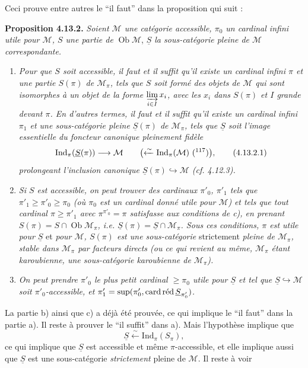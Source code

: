 \documentclass[11pt]{article}
\newcommand{\printedpage}[1]{\marginpar{\footnotesize p.~#1}}
\newcommand{\msp}[1]{\marginpar{\footnotesize [#1]}}
\newcommand{\Ind}{\mathrm{Ind}}
\newcommand{\Ob}{\operatorname{Ob}}
\newcommand{\card}{\operatorname{card}}
\newcommand{\M}{\mathcal{M}}
\newcommand{\red}{\mathop{\textup{réd}}\nolimits}
\newcommand{\uS}{\underline{S}}
\begin{document}
Ceci prouve entre autres le “il faut” dans la proposition qui suit :

\textbf{Proposition 4.13.2.} \textit{Soient $\M$ une catégorie accessible, $\pi_0$ un cardinal infini utile pour $\M$, $S$ une partie de} $\Ob\M$, \textit{$\uS$ la sous-catégorie pleine de $\M$ correspondante.}

\msp{page 284}
\begin{enumerate}
\item[\textit{a)}] \textit{Pour que $S$ soit accessible, il faut et il suffit qu'il existe un cardinal infini $\pi$ et une partie $S(\pi)$ de $\M_\pi$, tels que $S$ soit formé des objets de $\M$ qui sont isomorphes à un objet de la forme $\varinjlim\limits_{i\in I} x_i$, avec les $x_i$ dans $S(\pi)$ et $I$ grande devant $\pi$. En d'autres termes, il faut et il suffit qu'il existe un cardinal infini $\pi_1$ et une sous-catégorie pleine %
$\uS(\pi)$ de $\M_\pi$, tels que $\uS$ soit l'image essentielle du foncteur canonique pleinement fidèle}
\[
\Ind_\pi(\uS(\pi)) \longrightarrow \M \qquad \bigl(\xleftarrow{\sim} \Ind_\pi(\M)\ \text{(\footnotemark[117])}\bigr) , \tag*{(4.13.2.1)} %
\]
\footnotetext[117]{si $\pi$ utile pour $\M$.}
\textit{prolongeant l'inclusion canonique $\uS(\pi) \hookrightarrow \M$ (cf. 4.12.3).}
\item[\textit{b)}] \printedpage{106}
\textit{Si $S$ est accessible, on peut trouver des cardinaux $\pi'_0$, $\pi'_1$ tels que $\pi'_1 \geqslant \pi'_0 \geqslant \pi_0$ (où $\pi_0$ est un cardinal donné utile pour $\M$)}
\msp{page 285}
\textit{et tels que tout cardinal $\pi \geqslant \pi'_1$ avec $\pi^{\pi'_0} = \pi$ satisfasse aux conditions de c), en prenant $S(\pi) = S \cap \Ob\M_\pi$, i.e. $\uS(\pi) = \uS \cap \M_\pi$. Sous ces conditions, $\pi$ est utile pour $\uS$} et \textit{pour $\M$, $S(\pi)$ est une sous-catégorie} strictement \textit{pleine de $\M_\pi$, stable dans $\M_\pi$ par facteurs directs (ou ce qui revient au même, $\M_\pi$ étant karoubienne, une sous-catégorie karoubienne de $\M_\pi$).}
\item[\textit{c)}] \textit{On peut prendre $\pi'_0$ le plus petit cardinal $\geqslant \pi_0$ utile pour $\uS$ et tel que $\uS \hookrightarrow \M$ soit $\pi'_0$-accessible, et $\pi'_1 = \sup(\pi'_0, \card\red\uS_{\pi'_0})$.}
\end{enumerate}

La partie b) ainsi que c) a déjà été prouvée, ce qui implique le “il faut” dans la partie a). Il reste à prouver le “il suffit” dans a). Mais l'hypothèse implique que
\[
\uS \xleftarrow{\sim} \Ind_\pi(S_\pi) ,
\]
ce qui implique que $\uS$ est accessible et même $\pi$-accessible, et elle implique aussi que $\uS$ est une sous-catégorie \textit{strictement} pleine de $\M$. Il reste à voir
\end{document}
